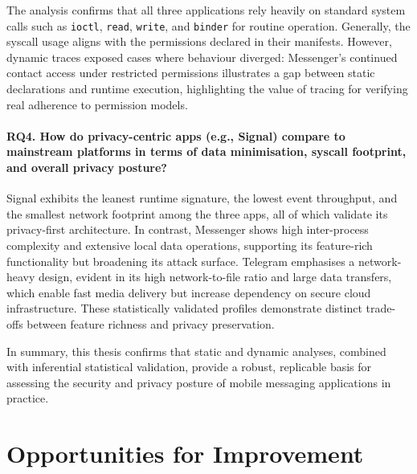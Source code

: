 \documentclass[a4paper,12pt]{report}
\begin{document}
The analysis confirms that all three applications rely heavily on standard system calls such as \texttt{ioctl}, \texttt{read}, \texttt{write}, and \texttt{binder} for routine operation. Generally, the syscall usage aligns with the permissions declared in their manifests. However, dynamic traces exposed cases where behaviour diverged: Messenger's continued contact access under restricted permissions illustrates a gap between static declarations and runtime execution, highlighting the value of tracing for verifying real adherence to permission models.

\paragraph{\textbf{RQ4.} How do privacy-centric apps (e.g., Signal) compare to mainstream platforms in terms of data minimisation, syscall footprint, and overall privacy posture?}

Signal exhibits the leanest runtime signature, the lowest event throughput, and the smallest network footprint among the three apps, all of which validate its privacy-first architecture. In contrast, Messenger shows high inter-process complexity and extensive local data operations, supporting its feature-rich functionality but broadening its attack surface. Telegram emphasises a network-heavy design, evident in its high network-to-file ratio and large data transfers, which enable fast media delivery but increase dependency on secure cloud infrastructure. These statistically validated profiles demonstrate distinct trade-offs between feature richness and privacy preservation.

In summary, this thesis confirms that static and dynamic analyses, combined with inferential statistical validation, provide a robust, replicable basis for assessing the security and privacy posture of mobile messaging applications in practice.

\section{Opportunities for Improvement}
\end{document}
